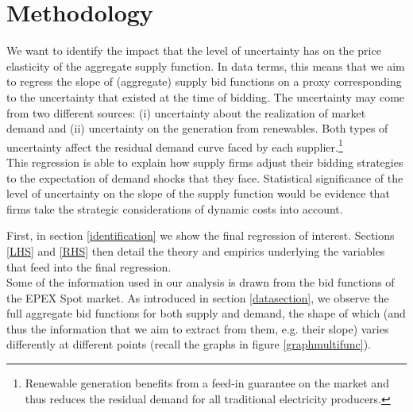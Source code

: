 \section{Methodology}
\label{newapproach}
We want to identify the impact that the level 
of 
uncertainty has on the price elasticity of the aggregate supply function. In data terms, this means that we aim to regress the slope of (aggregate) supply bid functions on a proxy corresponding to the uncertainty that existed at the time of bidding. The uncertainty may come from two different sources: (i) uncertainty about the realization of market demand and (ii) uncertainty on the generation from renewables. Both types of uncertainty affect the residual demand curve faced by each supplier.\footnote{Renewable generation benefits from a feed-in guarantee on the market and thus reduces the residual demand for all traditional electricity producers.}\\

This regression is able to explain how supply firms adjust their bidding strategies to the expectation of demand shocks that they face. Statistical significance of the level of uncertainty on the slope of the supply function would be evidence that firms take the strategic considerations of dynamic costs into account. \\


\label{strat}

First, in section \ref{identification} we show the final regression of interest. Sections \ref{LHS} and \ref{RHS} then detail the theory and empirics underlying the variables that feed into the final regression. \\

Some of the information used in our analysis is drawn from the bid functions of the EPEX Spot market. As introduced in section \ref{datasection}, we observe the full aggregate %
bid functions for both supply and demand, %
the shape of which %
(and thus the information that we aim to extract from them, e.g. their slope) varies differently at different points (recall the graphs in figure \ref{graphmultifunc}). \\

